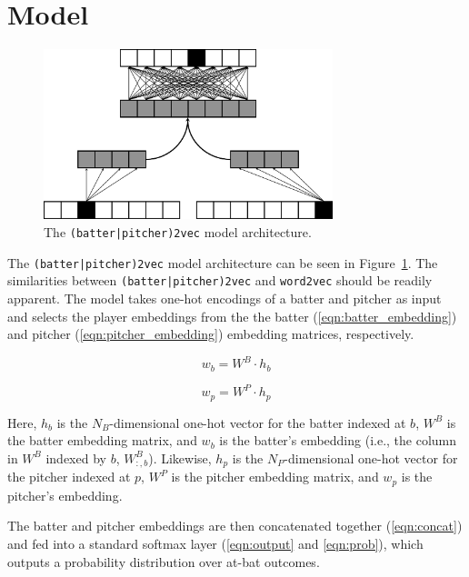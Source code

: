\documentclass{article}
\begin{document}
\section{Model}
\label{model}

\begin{figure}[h]
\centering
\includegraphics[width=0.75\textwidth,height=\textheight,keepaspectratio]{batter_pitcher_model.png}
\caption{The \texttt{(batter|pitcher)2vec} model architecture.}
\label{fig:batter_pitcher}
\end{figure}

The \texttt{(batter|pitcher)2vec} model architecture can be seen in Figure~\ref{fig:batter_pitcher}. The similarities between \texttt{(batter|pitcher)2vec} and \texttt{word2vec} should be readily apparent. The model takes one-hot encodings of a batter and pitcher as input and selects the player embeddings from the the batter (\ref{eqn:batter_embedding}) and pitcher (\ref{eqn:pitcher_embedding}) embedding matrices, respectively.

\begin{equation}
\label{eqn:batter_embedding}
w_b = W^B \cdot h_b
\end{equation}

\begin{equation}
\label{eqn:pitcher_embedding}
w_p = W^P \cdot h_p
\end{equation}

Here, $h_b$ is the $N_B$-dimensional one-hot vector for the batter indexed at $b$, $W^B$ is the batter embedding matrix, and $w_b$ is the batter's embedding (i.e., the column in $W^{B}$ indexed by $b$, $W^{B}_{:,b}$). Likewise, $h_p$ is the $N_P$-dimensional one-hot vector for the pitcher indexed at $p$, $W^P$ is the pitcher embedding matrix, and $w_p$ is the pitcher's embedding.

The batter and pitcher embeddings are then concatenated together (\ref{eqn:concat}) and fed into a standard softmax layer (\ref{eqn:output} and \ref{eqn:prob}), which outputs a probability distribution over at-bat outcomes.
\end{document}
